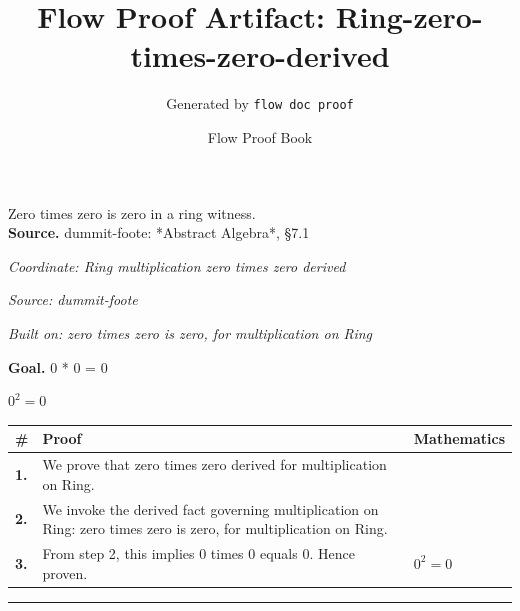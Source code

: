 \documentclass[11pt]{article}
\title{Flow Proof Artifact: Ring-zero-times-zero-derived}
\author{Generated by \texttt{flow doc proof}}
\date{Flow Proof Book}
\theoremstyle{definition}
\begin{document}
\maketitle
Zero times zero is zero in a ring witness.\\[0.5em]
\textbf{Source.} dummit-foote: *Abstract Algebra*, §7.1\\[0.5em]
\bigskip
{}\par
\smallskip\noindent\textit{Coordinate: Ring \cdot multiplication \cdot zero times zero derived}\par
\smallskip\noindent\textit{Source: dummit-foote}\par
\smallskip\noindent\textit{Built on: zero times zero is zero, for multiplication on Ring}\par
\medskip
\noindent\textbf{Goal.} 0 * 0 = 0\par
\noindent$\displaystyle 0^{2} = 0$\par
\medskip
\noindent
\begin{tabular}{@{} >{\raggedright\arraybackslash}p{} >{\raggedright\arraybackslash}p{} >{\raggedleft\arraybackslash}p{} @{}}
\textbf{\#} & \textbf{Proof} & \textbf{Mathematics} \\
\midrule
\textbf{1.} & We prove that zero times zero derived for multiplication on Ring. & \\[0.45em]
\textbf{2.} & We invoke the derived fact governing multiplication on Ring: zero times zero is zero, for multiplication on Ring. & \\[0.45em]
\textbf{3.} & From step 2, this implies 0 times 0 equals 0. Hence proven. & $\displaystyle 0^{2} = 0$ \\[0.45em]
\bottomrule
\end{tabular}
\label{thm:Ring-multiplication-zero_times_zero_derived}
\par\medskip\hrule
\end{document}
